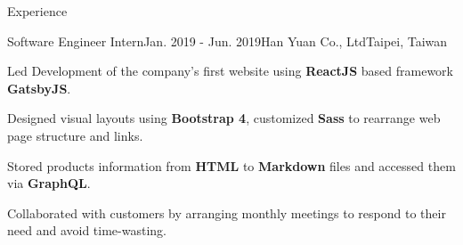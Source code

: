 \documentclass{resume} %
\begin{document}
\begin{rSection}{Experience}

\begin{rSubsection}{Software Engineer Intern}{Jan. 2019 - Jun. 2019}{Han Yuan Co., Ltd}{Taipei, Taiwan}
\item Led Development of the company's first website using \textbf{ReactJS} based framework \textbf{GatsbyJS}.
\item Designed visual layouts using \textbf{Bootstrap 4}, customized \textbf{Sass} to rearrange web page structure and links.
\item Stored products information from \textbf{HTML} to \textbf{Markdown} files and accessed them via \textbf{GraphQL}.
\item Collaborated with customers by arranging monthly meetings to respond to their need and avoid time-wasting.

\end{rSubsection}

\end{rSection}
\end{document}
